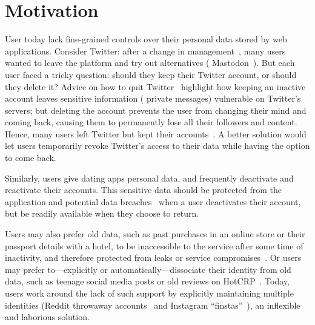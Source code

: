 \section{Motivation} 
User today lack fine-grained controls over their personal data stored by web
applications.
%
Consider Twitter: after a change in management~\cite{musk-twitter}, many users
wanted to leave the platform and try out alternatives (\eg
Mastodon~\cite{mastadon}).  But each user faced a tricky question: should they
keep their Twitter account, or should they delete it?
%
Advice on how to quit Twitter~\cite{quit-twitter-india, quit-twitter-mash}
highlight how keeping an inactive account leaves sensitive information (\eg
private messages) vulnerable on Twitter's servers; but deleting the account
prevents the user from changing their mind and coming back, causing them to
permanently lose all their followers and content.  Hence, many users left
Twitter but kept their accounts~\cite{nbc-twitter,shondarhimes,kenolin}.
%
A better solution would let users temporarily revoke Twitter's access to their
data while having the option to come back.

Similarly, users give dating apps personal data, and frequently deactivate and
reactivate their accounts.
%
This sensitive data should be protected from the application and potential data
breaches~\cite{tinder, okcupid} when a user deactivates their account, but be
readily available when they choose to return.

Users may also prefer old data, such as past purchases in an online store or
their passport details with a hotel, to be inaccessible to the service after
some time of inactivity, and therefore protected from leaks or service
compromises~\cite{retention,breach:marriott}. Or users may prefer
to---explicitly or automatically---dissociate their identity from old data, such
as teenage social media posts or old reviews on HotCRP~\cite{hotcrp}.
%
Today, users work around the lack of such support by explicitly maintaining
multiple identities (\eg Reddit throwaway accounts~\cite{reddit:throwaway} and
Instagram ``finstas''~\cite{nytimes:finsta}), an inflexible and laborious
solution.
%

